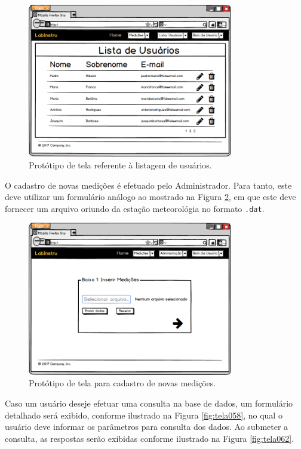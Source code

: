 \begin{figure}[H]
	\centering
	\includegraphics[width=0.8\textwidth]{./img/telas/tela033.png}
	\caption{Protótipo de tela referente à listagem de usuários.} \label{fig:tela033}
\end{figure}

O cadastro de novas medições é efetuado pelo Administrador. Para tanto, este deve utilizar um formulário análogo ao mostrado na Figura \ref{fig:tela053}, em que este deve fornecer um arquivo oriundo da estação meteorológia no formato \texttt{.dat}.

\begin{figure}[H]
	\centering
	\includegraphics[width=0.8\textwidth]{./img/telas/tela053.png}
	\caption{Protótipo de tela para cadastro de novas medições.} \label{fig:tela053}
\end{figure}

Caso um usuário deseje efetuar uma consulta na base de dados, um formulário detalhado será exibido, conforme ilustrado na Figura  \ref{fig:tela058}, no qual o usuário deve informar os parâmetros para consulta dos dados. Ao submeter a consulta, as respostas serão exibidas conforme ilustrado na Figura \ref{fig:tela062}.

